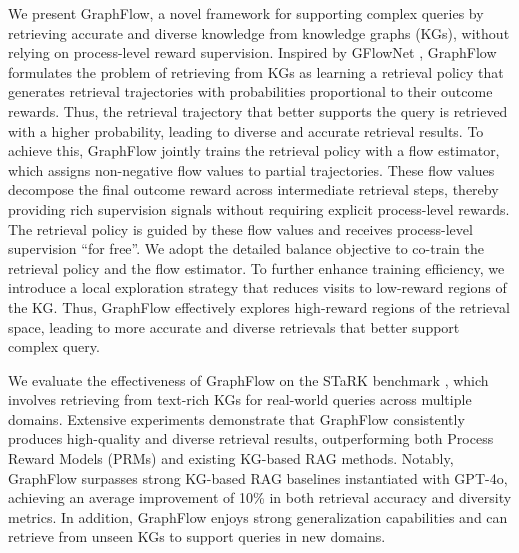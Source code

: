 We present GraphFlow, a novel framework for supporting complex queries by retrieving accurate and diverse knowledge from knowledge graphs (KGs), without relying on process-level reward supervision.
Inspired by GFlowNet \cite{bengio2023gflownet}, GraphFlow formulates the problem of retrieving from KGs as learning a retrieval policy that generates retrieval trajectories with probabilities proportional to their outcome rewards.
Thus, the retrieval trajectory that better supports the query is retrieved with a higher probability, leading to diverse and accurate retrieval results.
To achieve this, GraphFlow jointly trains the retrieval policy with a flow estimator, which assigns non-negative flow values to partial trajectories.
These flow values decompose the final outcome reward across intermediate retrieval steps, thereby providing rich supervision signals without requiring explicit process-level rewards.
The retrieval policy is guided by these flow values and receives process-level supervision “for free”.
We adopt the detailed balance objective \cite{shen2023towards} to co-train the retrieval policy and the flow estimator.
To further enhance training efficiency, we introduce a local exploration strategy that reduces visits to low-reward regions of the KG.
Thus, GraphFlow effectively explores high-reward regions of the retrieval space, leading to more accurate and diverse retrievals that better support complex query.


We evaluate the effectiveness of GraphFlow on the STaRK benchmark \cite{wu2024stark}, which involves retrieving from text-rich KGs for real-world queries across multiple domains. 
Extensive experiments demonstrate that GraphFlow consistently produces high-quality and diverse retrieval results, outperforming both Process Reward Models (PRMs) and existing KG-based RAG methods. 
Notably, GraphFlow surpasses strong KG-based RAG baselines instantiated with GPT-4o, achieving an average improvement of 10\% in both retrieval accuracy and diversity metrics. 
In addition, GraphFlow enjoys strong generalization capabilities and can retrieve from unseen KGs to support queries in new domains.



